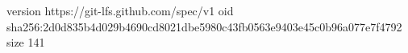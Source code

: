 version https://git-lfs.github.com/spec/v1
oid sha256:2d0d835b4d029b4690cd8021dbe5980c43fb0563e9403e45c0b96a077e7f4792
size 141
